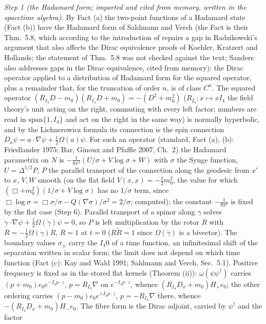 \emph{Step 1 (the Hadamard form; imported and cited from memory, written in the spacetime algebra).} By Fact (a) the two-point functions of a Hadamard state (Fact (b)) have the Hadamard form of Sahlmann and Verch (the Fact is their Thm.~5.8, which according to the introduction of \cite{SahlmannVerch2001} repairs a gap in Radzikowski's argument that also affects the Dirac equivalence proofs of Koehler, Kratzert and Hollands; the statement of Thm.~5.8 was not checked against the text; Sanders \cite{Sanders2010} also addresses gaps in the Dirac equivalence, cited from memory): the Dirac operator applied to a distribution of Hadamard form for the squared operator, plus a remainder that, for the truncation of order $n$, is of class $C^{n}$. The squared operator $(R_{I_{4}}D - m_{0})(R_{I_{4}}D + m_{0}) = -(D^{2} + m_{0}^{2})$ ($R_{I_{4}} : x \mapsto xI_{4}$ the field theory's unit acting on the right, commuting with every left factor; numbers are read in $\mathrm{span}\{1, I_{4}\}$ and act on the right in the same way) is normally hyperbolic, and by the Lichnerowicz formula its connection is the spin connection $D_{a}\psi = a\cdot\nabla\psi + \tfrac12\Omega(a)\psi$. For such an operator (standard, Fact (a), (b): Friedlander 1975; Bar, Ginoux and Pfaffle 2007, Ch.~2) the Hadamard parametrix on $N$ is $-\tfrac{1}{8\pi^{2}}(U/\sigma + V\log\sigma + W)$ with $\sigma$ the Synge function, $U = \Delta^{1/2}P$, $P$ the parallel transport of the connection along the geodesic from $x'$ to $x$, $V, W$ smooth (on the flat field $V(x, x) = -\tfrac12 m_{0}^{2}$, the value for which $(\Box + m_{0}^{2})(1/\sigma + V\log\sigma)$ has no $1/\sigma$ term, since $\Box\log\sigma = \Box\sigma/\sigma - Q(\nabla\sigma)/\sigma^{2} = 2/\sigma$; computed); the constant $-\tfrac{1}{8\pi^{2}}$ is fixed by the flat case (Step 6). Parallel transport of a spinor along $\gamma$ solves $\dot\gamma\cdot\nabla\psi + \tfrac12\Omega(\dot\gamma)\psi = 0$, so $P$ is left multiplication by the rotor $R$ with $\dot R = -\tfrac12\Omega(\dot\gamma)R$, $R = 1$ at $t = 0$ ($R\tilde R = 1$ since $\Omega(\dot\gamma)$ is a bivector). The boundary values $\sigma_{\pm}$ carry the $I_{4}0$ of a time function, an infinitesimal shift of the separation written in scalar form; the limit does not depend on which time function (Fact (c): Kay and Wald 1991; Sahlmann and Verch, Sec.~5.1). Positive frequency is fixed as in the stored flat kernels (Theorem (ii)): $\omega(\psi\psi^{\dagger})$ carries $(p + m_{0})e_{0}e^{-I_{4}p\cdot z}$, $p = R_{I_{4}}\nabla$ on $e^{-I_{4}p\cdot z}$, whence $(R_{I_{4}}D_{x} + m_{0})H_{+}e_{0}$; the other ordering carries $(p - m_{0})e_{0}e^{+I_{4}p\cdot z}$, $p = -R_{I_{4}}\nabla$ there, whence $-(R_{I_{4}}D_{x} + m_{0})H_{-}e_{0}$. The fibre form is the Dirac adjoint, carried by $\psi^{\dagger}$ and the factor 